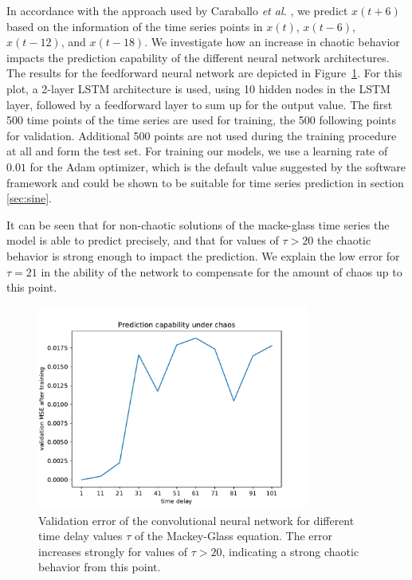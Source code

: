 \documentclass{article}
\begin{document}
In accordance with the approach used by Caraballo \textit{et al.}
\cite{caraballo2016}, we predict $x(t+6)$ based on the information of the time
series points in $x(t)$, $x(t-6)$, $x(t-12)$, and $x(t-18)$. We investigate how
an increase in chaotic behavior impacts the prediction capability of the
different neural network architectures. The results for the feedforward neural
network are depicted in Figure~\ref{fig:mackey_cnn}. For this plot, a 2-layer
LSTM architecture is used, using 10 hidden nodes in the LSTM layer,
followed by a feedforward layer to sum up for the output value.
The first 500 time points of the time series are used for training, the 500
following points for validation. Additional 500 points are not used during the
training procedure at all and form the test set. For training our models, we
use a learning rate of $0.01$ for the Adam optimizer, which is the default
value suggested by the software framework and could be shown to be suitable for
time series prediction in section \ref{sec:sine}.

It can be seen that for non-chaotic solutions of the macke-glass time series the
model is able to predict precisely, and that for values of $\tau > 20$ the
chaotic behavior is strong enough to impact the prediction. We explain the low
error for $\tau = 21$ in the ability of the network to compensate for the amount
of chaos up to this point.

\begin{figure}
    \centering
    \includegraphics[width=0.8\textwidth]{figures/mackey_glass_cnn.pdf}
    \caption{Validation error of the convolutional neural network for different
        time delay values $\tau$ of the Mackey-Glass equation. The error increases
        strongly for values of $\tau > 20$, indicating a strong chaotic behavior
        from this point.}
    \label{fig:mackey_cnn}
\end{figure}
\end{document}
